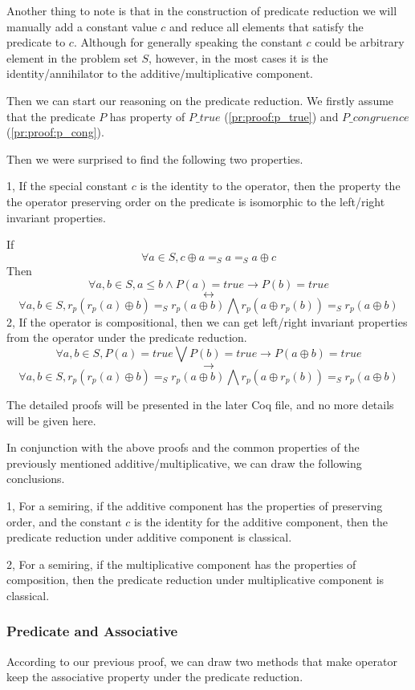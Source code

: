 \documentclass[a4paper,10pt]{article}
\begin{document}
Another thing to note is that in the construction of predicate reduction we will manually add a constant value $c$ and reduce all elements that satisfy the predicate to $c$.
Although for generally speaking the constant $c$ could be arbitrary element in the problem set $S$, however, in the most cases it is the identity/annihilator to the additive/multiplicative component.

Then we can start our reasoning on the predicate reduction. We firstly assume that the predicate $P$ has property of $P\_true$ (\ref{pr:proof:p_true}) and $P\_congruence$ (\ref{pr:proof:p_cong}). 

Then we were surprised to find the following two properties.

1, If the special constant $c$ is the identity to the operator, then the property the the operator preserving order on the predicate is isomorphic to the left/right invariant properties.

If \[\forall a \in S, c \oplus a =_S a =_S a \oplus c\]
Then
\[\forall a,b \in S, a \leq b \wedge P(a) = true \rightarrow P(b) = true\]
\[\longleftrightarrow\]
\[\forall a,b \in S, r_p(r_p(a) \oplus b) =_S r_p(a \oplus b) \bigwedge r_p(a \oplus r_p(b)) =_S r_p(a \oplus b)\]
2, If the operator is compositional, then we can get left/right invariant properties from the operator under the predicate reduction.
\[\forall a,b \in S, P(a) = true \bigvee P (b) = true \rightarrow P(a \oplus b)= true\]
\[\longrightarrow\]
\[\forall a,b \in S, r_p(r_p(a) \oplus b) =_S r_p(a \oplus b) \bigwedge r_p(a \oplus r_p(b)) =_S r_p(a \oplus b)\]

The detailed proofs will be presented in the later Coq file, and no more details will be given here.

In conjunction with the above proofs and the common properties of the previously mentioned additive/multiplicative, we can draw the following conclusions.

1, For a semiring, if the additive component has the properties of preserving order, and the constant $c$ is the identity for the additive component, then the predicate reduction under additive component is classical.

2, For a semiring, if the multiplicative component has the properties of composition, then the predicate reduction under multiplicative component is classical.
\subsubsection{Predicate and Associative}
According to our previous proof, we can draw two methods that make operator keep the associative property under the predicate reduction.
\end{document}
